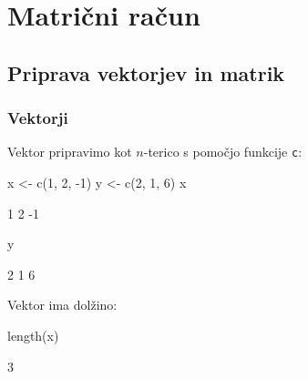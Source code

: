 \section{Matrični račun}
\subsection{Priprava vektorjev in matrik}

\begin{frame}[fragile]
\frametitle{Vektorji}
Vektor pripravimo kot $n$-terico s pomočjo funkcije \texttt{c}:
\begin{Schunk}
\begin{Sinput}
 x <- c(1, 2, -1)
 y <- c(2, 1, 6)
 x
\end{Sinput}
\begin{Soutput}
[1]  1  2 -1
\end{Soutput}
\begin{Sinput}
 y
\end{Sinput}
\begin{Soutput}
[1] 2 1 6
\end{Soutput}
\end{Schunk}
Vektor ima dolžino:
\begin{Schunk}
\begin{Sinput}
 length(x)
\end{Sinput}
\begin{Soutput}
[1] 3
\end{Soutput}
\end{Schunk}
\end{frame}

